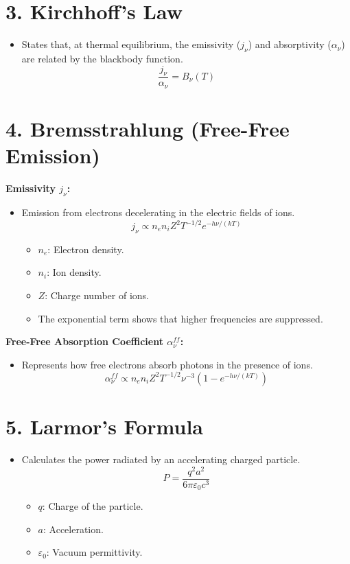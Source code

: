 \documentclass{article}
\begin{document}
\section*{3. Kirchhoff's Law}

\begin{itemize}
    \item States that, at thermal equilibrium, the emissivity (\( j_\nu \)) and absorptivity (\( \alpha_\nu \)) are related by the blackbody function.
          \[
              \frac{j_\nu}{\alpha_\nu} = B_\nu(T)
          \]
\end{itemize}

\section*{4. Bremsstrahlung (Free-Free Emission)}

\textbf{Emissivity \( j_\nu \):}
\begin{itemize}
    \item Emission from electrons decelerating in the electric fields of ions.
          \[
              j_\nu \propto n_e n_i Z^2 T^{-1/2} e^{-h\nu/(kT)}
          \]
          \begin{itemize}
              \item \( n_e \): Electron density.
              \item \( n_i \): Ion density.
              \item \( Z \): Charge number of ions.
              \item The exponential term shows that higher frequencies are suppressed.
          \end{itemize}
\end{itemize}

\textbf{Free-Free Absorption Coefficient \( \alpha_\nu^{ff} \):}
\begin{itemize}
    \item Represents how free electrons absorb photons in the presence of ions.
          \[
              \alpha_\nu^{ff} \propto n_e n_i Z^2 T^{-1/2} \nu^{-3} \left(1 - e^{-h\nu/(kT)}\right)
          \]
\end{itemize}

\section*{5. Larmor's Formula}

\begin{itemize}
    \item Calculates the power radiated by an accelerating charged particle.
          \[
              P = \frac{q^2 a^2}{6\pi \varepsilon_0 c^3}
          \]
          \begin{itemize}
              \item \( q \): Charge of the particle.
              \item \( a \): Acceleration.
              \item \( \varepsilon_0 \): Vacuum permittivity.
          \end{itemize}
\end{itemize}
\end{document}
